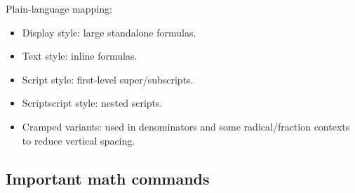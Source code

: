 \documentclass[11pt]{article}
\newcommand{\tightlist}{}
\begin{document}
Plain-language mapping:

\begin{itemize}
\tightlist
\item
  Display style: large standalone formulas.
\item
  Text style: inline formulas.
\item
  Script style: first-level super/subscripts.
\item
  Scriptscript style: nested scripts.
\item
  Cramped variants: used in denominators and some radical/fraction contexts to reduce vertical spacing.
\end{itemize}

\subsection{Important math commands}\label{important-math-commands}
\end{document}
